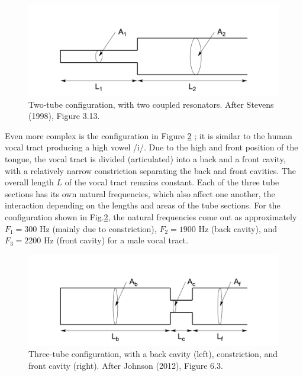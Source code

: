 \documentclass[
]{book}
\begin{document}
\begin{figure}

{\centering \includegraphics{figures/twotube} 

}

\caption{Two-tube configuration, with two coupled resonators. After Stevens (1998), Figure 3.13.}\label{fig:twotube}
\end{figure}

Even more complex is the configuration in Figure \ref{fig:threetube} \citep[after][Fig.3.15, p.144]{Stevens_1998}; it is similar to the human vocal tract producing a high vowel /i/. Due to the high and front position of the tongue, the vocal tract is divided (articulated) into a back and a front cavity, with a relatively narrow constriction separating the back and front cavities. The overall length \(L\) of the vocal tract remains constant. Each of the three tube sections has its own natural frequencies, which also affect one another, the interaction depending on the lengths and areas of the tube sections. For the configuration shown in Fig.\ref{fig:threetube}, the natural frequencies come out as approximately \(F_1=300\) Hz (mainly due to constriction), \(F_2=1900\) Hz (back cavity), and \(F_3=2200\) Hz (front cavity) \citep[137]{Johnson_2012} for a male vocal tract.

\begin{figure}

{\centering \includegraphics{figures/threetube} 

}

\caption{Three-tube configuration, with a back cavity (left), constriction, and front cavity (right). After Johnson (2012), Figure 6.3.}\label{fig:threetube}
\end{figure}
\end{document}
